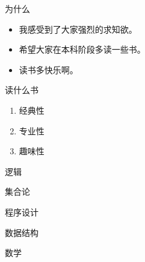 \begin{frame}{为什么}
  \begin{itemize}
    \item 我感受到了大家强烈的求知欲。
    \item 希望大家在本科阶段多读一些书。
    \item 读书多快乐啊。
  \end{itemize}
\end{frame}

\begin{frame}{读什么书}
  \begin{enumerate}
    \centering
    \item 经典性
    \item 专业性
    \item 趣味性
  \end{enumerate}
\end{frame}

\begin{frame}{逻辑}
\end{frame}

\begin{frame}{集合论}
\end{frame}

\begin{frame}{程序设计}
\end{frame}

\begin{frame}{数据结构}
\end{frame}

\begin{frame}{数学}
\end{frame}

